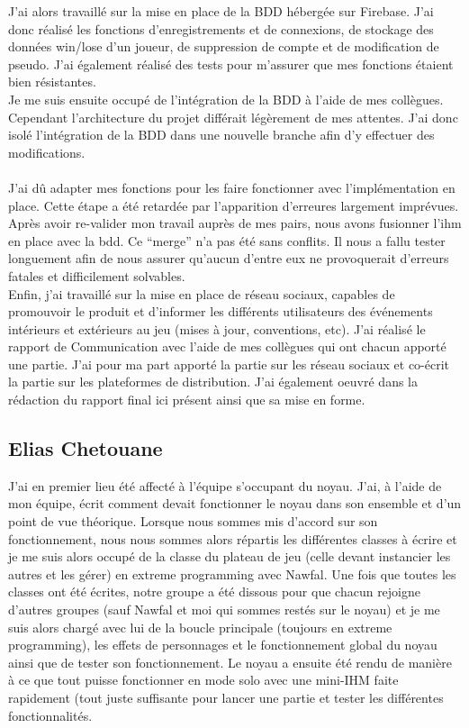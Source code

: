 \documentclass[a4paper,11pt]{article}
\begin{document}
    J’ai alors travaillé sur la mise en place de la BDD hébergée sur Firebase. J’ai donc réalisé les fonctions d’enregistrements et de connexions, de stockage des données win/lose d’un joueur, de suppression de compte et de modification de pseudo. J’ai également réalisé des tests pour m’assurer que mes fonctions étaient bien résistantes. \\

    Je me suis ensuite occupé de l’intégration de la BDD à l’aide de mes collègues. Cependant l’architecture du projet différait légèrement de mes attentes. J’ai donc isolé l’intégration de la BDD dans une nouvelle branche afin d’y effectuer des modifications. \\\\

    J’ai dû adapter mes fonctions pour les faire fonctionner avec l’implémentation en place. Cette étape a été retardée par l’apparition d’erreures largement imprévues.
    Après avoir re-valider mon travail auprès de mes pairs, nous avons fusionner l’ihm en place avec la bdd. Ce “merge” n’a pas été sans conflits. Il nous a fallu tester longuement afin de nous assurer qu’aucun d’entre eux ne provoquerait d’erreurs fatales et difficilement solvables. \\

    Enfin, j’ai travaillé sur la mise en place de réseau sociaux, capables de promouvoir le produit et d’informer les différents utilisateurs des événements intérieurs et extérieurs au jeu (mises à jour, conventions, etc). J’ai réalisé le rapport de Communication avec l’aide de mes collègues qui ont chacun apporté une partie. J’ai pour ma part apporté la partie sur les réseau sociaux et co-écrit la partie sur les plateformes de distribution. J’ai également oeuvré dans la rédaction du rapport final ici présent ainsi que sa mise en forme. \\
  
\subsection{Elias Chetouane}

	J’ai en premier lieu été affecté à l’équipe s’occupant du noyau. J’ai, à l’aide de mon équipe, écrit comment devait fonctionner le noyau dans son ensemble et d’un point de vue théorique. Lorsque nous sommes mis d’accord sur son fonctionnement, nous nous sommes alors répartis les différentes classes à écrire et je me suis alors occupé de la classe du plateau de jeu (celle devant instancier les autres et les gérer) en extreme programming avec Nawfal. Une fois que toutes les classes ont été écrites, notre groupe a été dissous pour que chacun rejoigne d’autres groupes (sauf Nawfal et moi qui sommes restés sur le noyau) et je me suis alors chargé avec lui de la boucle principale (toujours en extreme programming), les effets de personnages et le fonctionnement global du noyau ainsi que de tester son fonctionnement. Le noyau a ensuite été rendu de manière à ce que tout puisse fonctionner en mode solo avec une mini-IHM faite rapidement (tout juste suffisante pour lancer une partie et tester les différentes fonctionnalités. \\
\end{document}
